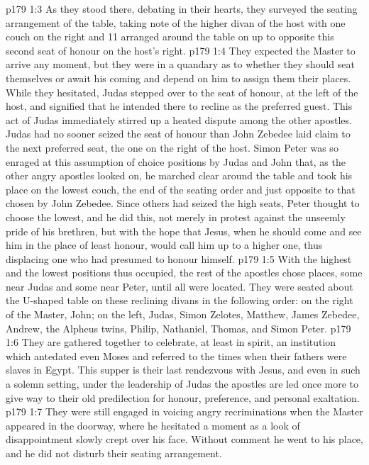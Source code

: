 \vs p179 1:3 As they stood there, debating in their hearts, they surveyed the seating arrangement of the table, taking note of the higher divan of the host with one couch on the right and 11 arranged around the table on up to opposite this second seat of honour on the host’s right.
\vs p179 1:4 They expected the Master to arrive any moment, but they were in a quandary as to whether they should seat themselves or await his coming and depend on him to assign them their places. While they hesitated, Judas stepped over to the seat of honour, at the left of the host, and signified that he intended there to recline as the preferred guest. This act of Judas immediately stirred up a heated dispute among the other apostles. Judas had no sooner seized the seat of honour than John Zebedee laid claim to the next preferred seat, the one on the right of the host. Simon Peter was so enraged at this assumption of choice positions by Judas and John that, as the other angry apostles looked on, he marched clear around the table and took his place on the lowest couch, the end of the seating order and just opposite to that chosen by John Zebedee. Since others had seized the high seats, Peter thought to choose the lowest, and he did this, not merely in protest against the unseemly pride of his brethren, but with the hope that Jesus, when he should come and see him in the place of least honour, would call him up to a higher one, thus displacing one who had presumed to honour himself.
\vs p179 1:5 With the highest and the lowest positions thus occupied, the rest of the apostles chose places, some near Judas and some near Peter, until all were located. They were seated about the U\hyp{}shaped table on these reclining divans in the following order: on the right of the Master, John; on the left, Judas, Simon Zelotes, Matthew, James Zebedee, Andrew, the Alpheus twins, Philip, Nathaniel, Thomas, and Simon Peter.
\vs p179 1:6 \pc They are gathered together to celebrate, at least in spirit, an institution which antedated even Moses and referred to the times when their fathers were slaves in Egypt. This supper is their last rendezvous with Jesus, and even in such a solemn setting, under the leadership of Judas the apostles are led once more to give way to their old predilection for honour, preference, and personal exaltation.
\vs p179 1:7 \pc They were still engaged in voicing angry recriminations when the Master appeared in the doorway, where he hesitated a moment as a look of disappointment slowly crept over his face. Without comment he went to his place, and he did not disturb their seating arrangement.

